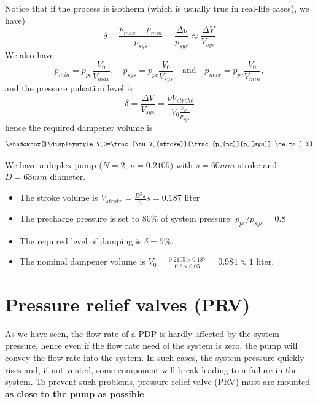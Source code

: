 \noindent Notice that if the process is isotherm (which is usually true in real-life cases), we have)
%
\begin{equation}
\delta =\frac{p_{max}-p_{min}}{p_{sys}} = \frac{\Delta p}{p_{sys}} \approx\frac{\Delta V}{V_{sys}}
\end{equation}
%
\noindent We also have
%
\begin{equation}
p_{min}=p_{pc} \frac{V_0}{V_{max}}, \quad p_{sys}=p_{pc} \frac{V_0}{V_{sys}}\quad \text{and} \quad p_{max}=p_{pc} \frac{V_0}{V_{min}},
\end{equation}
%
and the pressure pulsation level is 
%
\begin{equation}
\delta =\frac{\Delta V}{V_{sys}} = \frac{\nu V_{stroke}}{V_0 \frac{p_{pc}}{p_{sys}}}
\label{eq:delta}
\end{equation}
%
hence the required dampener volume is
%
\begin{equation}
\shadowbox{$\displaystyle
V_0=\frac{\nu V_{stroke}}{\frac{p_{pc}}{p_{sys}} \delta}
$}
\end{equation}


 We have a duplex pump ($N=2$, $\nu=0.2105$) with $s=60mm$ stroke and $D=63mm$ diameter.
%
\begin{itemize}
\item The stroke volume is $V_{stroke}=\frac{D^2 \pi}{4}s = 0.187$ liter
\item The precharge pressure is set to 80\% of system pressure: $p_{pc}/p_{sys}=0.8$
\item The required level of damping is $\delta=5\%$.
\item The nominal dampener volume is $V_0=\frac{0.2105 \times 0.187}{0.8\times 0.05}=0.984\approx1$ liter.
\end{itemize}

\clearpage



\section{Pressure relief valves (PRV)}

As we have seen, the flow rate of a PDP is hardly affected by the system pressure, hence even if the flow rate need of the system is zero, the pump will convey the flow rate into the system. In such cases, the system pressure quickly rises and, if not vented, some component will break leading to a failure in the system. To prevent such problems, pressure relief valve (PRV) must are mounted {\bf as close to the pump as possible}.

